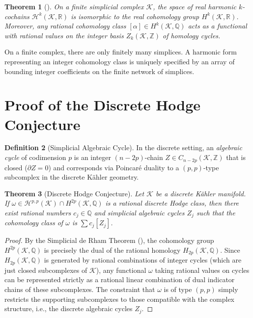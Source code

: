 \documentclass[12pt, a4paper]{article}
\theoremstyle{plain}
\newtheorem{theorem}{Theorem}[section]
\theoremstyle{definition}
\newtheorem{definition}[theorem]{Definition}
\theoremstyle{remark}
\newcommand{\R}{\mathbb{R}}
\newcommand{\Z}{\mathbb{Z}}
\newcommand{\Q}{\mathbb{Q}}
\newcommand{\K}{\mathcal{K}}
\newcommand{\calH}{\mathcal{H}}
\begin{document}
\begin{theorem}[\citet{Eckmann1945}]\label{thm:eckmann}
On a finite simplicial complex $\K$, the space of real harmonic $k$-cochains
$\calH^k(\K, \R)$ is isomorphic to the real cohomology group $H^k(\K, \R)$.
Moreover, any rational cohomology class $[\alpha] \in H^k(\K, \Q)$ acts as a
functional with rational values on the integer basis $Z_k(\K, \Z)$ of homology
cycles.
\end{theorem}

On a finite complex, there are only finitely many simplices. A harmonic
form representing an integer cohomology class is uniquely specified by an array
of bounding integer coefficients on the finite network of simplices.

\section{Proof of the Discrete Hodge Conjecture}

\begin{definition}[Simplicial Algebraic Cycle]
In the discrete setting, an \emph{algebraic cycle} of codimension $p$ is an integer
$(n-2p)$-chain $Z \in C_{n-2p}(\K, \Z)$ that is closed ($\partial Z = 0$) and
corresponds via Poincaré duality to a $(p,p)$-type subcomplex in the discrete
K\"ahler geometry.
\end{definition}

\begin{theorem}[Discrete Hodge Conjecture]
Let $\K$ be a discrete K\"ahler manifold. If $\omega \in \calH^{p,p}(\K) \cap H^{2p}(\K, \Q)$
is a rational discrete Hodge class, then there exist rational numbers $c_j \in \Q$
and simplicial algebraic cycles $Z_j$ such that the cohomology class of $\omega$ is
$\sum c_j [Z_j]$.
\end{theorem}

\begin{proof}
By the Simplicial de Rham Theorem (), the cohomology group
$H^{2p}(\K, \Q)$ is precisely the dual of the rational homology $H_{2p}(\K, \Q)$.
Since $H_{2p}(\K, \Q)$ is generated by rational combinations of integer cycles
(which are just closed subcomplexes of $\K$), any functional $\omega$ taking rational
values on cycles can be represented strictly as a rational linear combination of
dual indicator chains of these subcomplexes. The constraint that $\omega$
is of type $(p,p)$ simply restricts the supporting subcomplexes to those
compatible with the complex structure, i.e., the discrete algebraic cycles $Z_j$.
\end{proof}
\end{document}
